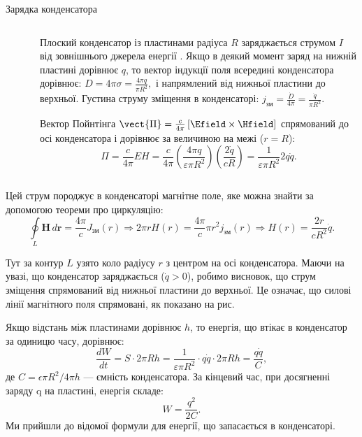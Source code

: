 \documentclass[onlytextwidth]{beamer}
\begin{document}
\begin{frame}{Зарядка конденсатора}{}
\begin{columns}
\begin{column}{0.35\linewidth}
		\end{column}
		\
		\begin{column}{0.6\linewidth}
			\begin{overprint}
				\begin{block}{}\justifying
					Плоский конденсатор із пластинами радіуса \( R \) заряджається струмом \( I \) від зовнішнього джерела енергії . Якщо в
					деякий момент
					заряд на нижній пластині дорівнює \( q \), то вектор індукції поля всередині конденсатора дорівнює:
					\(
					D = 4 \pi \sigma = \frac{4 \pi q}{\pi R^2},
					\)
					і напрямлений від нижньої пластини до верхньої.
					Густина струму зміщення в конденсаторі:
					\(
					j_{\text{зм}} = \frac{\dot{D}}{4 \pi} = \frac{\dot{q}}{\pi R^2}.
					\)
				\end{block}
				\onslide<2>
				\begin{block}{}\justifying
					Вектор Пойнтінга
					\(
					\vect{\Pi} = \frac{c}{4\pi}\left[\Efield\times\Hfield\right]
					\)
					спрямований до осі конденсатора і дорівнює за величиною на межі (\( r = R \)):
					\[
						\Pi = \frac{c}{4 \pi} EH = \frac{c}{4 \pi} \left( \frac{4 \pi q}{\varepsilon \pi R^2} \right) \left( \frac{2
							\dot{q}}{c R}
						\right) =
						\frac{1}{\varepsilon
							\pi R^2} 2 q \dot{q}.
					\]
				\end{block}
			\end{overprint}
		\end{column}
	\end{columns}
	\begin{overprint}
		\begin{block}{}\justifying
			Цей струм породжує в конденсаторі магнітне поле, яке можна знайти за допомогою теореми про циркуляцію:
			\[
				\oint\limits_{L} \mathbf{H} \, d\mathbf{r} = \frac{4 \pi}{c} J_{\text{зм}}(r)
				\Rightarrow 2 \pi r H(r) = \frac{4 \pi}{c} \pi r^2 j_{\text{зм}}(r)
				\Rightarrow H(r) = \frac{2r}{c R^2} \dot{q}.
			\]

			Тут за контур \( L \) узято коло радіусу \( r \) з центром на осі конденсатора. Маючи на увазі, що конденсатор заряджається (\(
			\dot{q} > 0 \)), робимо висновок, що струм зміщення спрямований від нижньої пластини до верхньої. Це означає, що силові лінії
			магнітного поля
			спрямовані, як 	показано на рис.
		\end{block}
		\begin{block}{}\justifying
			Якщо відстань між пластинами дорівнює \( h \), то енергія, що втікає в конденсатор за одиницю часу, дорівнює:
			\[
				\frac{dW}{dt} = S \cdot 2 \pi R h = \frac{1}{\varepsilon \pi R^2} \cdot q \dot{q} \cdot 2 \pi R h = \frac{q \dot{q}}{C},
			\]
			де \( C = \epsilon \pi R^2 / 4\pi h\) --- ємність конденсатора. За кінцевий час, при досягненні заряду q на пластині, енергія складе:
			\[
				W = \frac{q^2}{2C}.
			\]
			Ми прийшли до відомої формули для енергії, що запасається в конденсаторі.
		\end{block}
	\end{overprint}
\end{frame}
\end{document}
